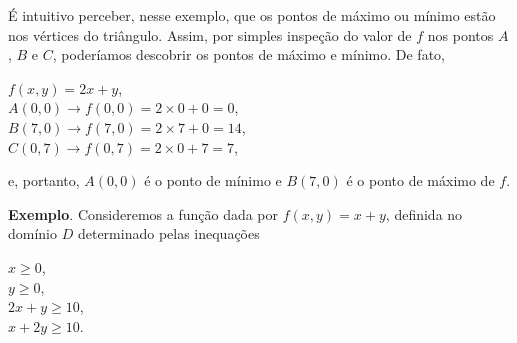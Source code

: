 		É intuitivo perceber, nesse exemplo, que os pontos de máximo ou mínimo estão nos vértices do triângulo. Assim, por simples inspeção do valor de $f$ nos pontos $A$, $B$ e $C$, poderíamos descobrir os pontos de máximo e mínimo.
			De fato,

		\medskip

		$f(x, y) = 2x + y$, \\
		$A(0, 0) \rightarrow f(0, 0) = 2 \times 0 + 0 = 0$, \\
		$B(7, 0) \rightarrow f(7, 0) = 2 \times 7 + 0 = 14$, \\
		$C(0, 7) \rightarrow f(0, 7) = 2 \times 0 + 7 = 7$,

		\medskip

		e, portanto, $A(0, 0)$ é o ponto de mínimo e $B(7, 0)$ é o ponto de máximo de $f$.

		\bigskip

		\textbf{Exemplo}. Consideremos a função dada por $f(x, y) = x + y$, definida no domínio $D$ determinado pelas inequações

		\medskip

		$x \geq 0$, \\
		$y \geq 0$, \\
		$2x + y \geq 10$, \\
		$x + 2y \geq 10$.

		\medskip

